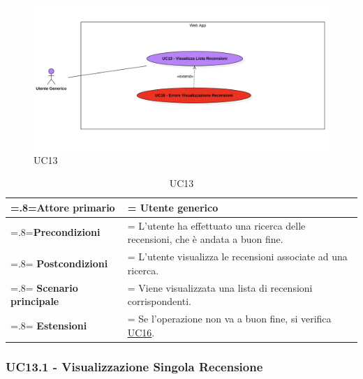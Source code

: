             \begin{figure}[H]
                \centering
                \includegraphics[scale=0.6]{src/img/UC13.png}
                \caption{UC13}
            \end{figure}

            \begin{table}[H]
                \centering
                \renewcommand{\arraystretch}{1.8}
                \renewcommand\tabularxcolumn[1]{m{#1}}
                \begin{tabularx}{0.9\textwidth} {
                    >{\hsize=.8\hsize\linewidth=\hsize}X
                    >{\hsize=1.2\hsize\linewidth=\hsize}X}
                    \hline
                    \textbf{Attore primario} & Utente generico \\
                    \hline
                    \textbf{Precondizioni} & L'utente ha effettuato una ricerca delle recensioni, che è andata a buon fine. \\
                    \hline
                    \textbf{Postcondizioni} & L'utente visualizza le recensioni associate ad una ricerca. \\
                    \hline
                    \textbf{Scenario principale} & Viene visualizzata una lista di recensioni corrispondenti. \\
                    \hline
                    \textbf{Estensioni} & Se l'operazione non va a buon fine, si verifica \hyperref[UC16]{UC16}. \\
                    \hline
                \end{tabularx}
                \caption{UC13}
            \end{table}

        \subsubsection{UC13.1 - Visualizzazione Singola Recensione}
        \label{UC13.1}

